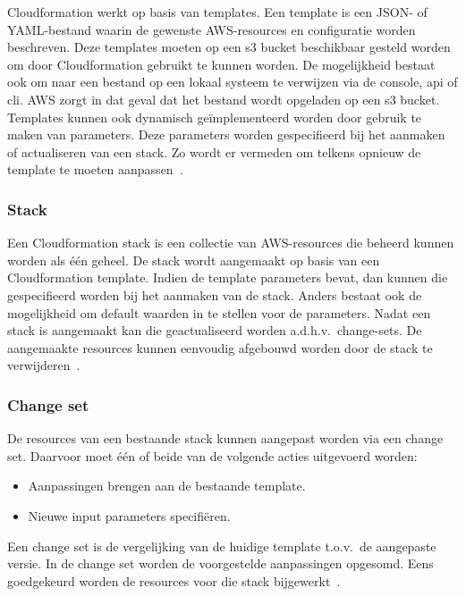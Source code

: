 Cloudformation werkt op basis van templates.
Een template is een JSON- of YAML-bestand waarin de gewenste AWS-resources en configuratie worden beschreven.
Deze templates moeten op een \acrshort{s3} bucket beschikbaar gesteld worden om door Cloudformation gebruikt te kunnen worden.
De mogelijkheid bestaat ook om naar een bestand op een lokaal systeem te verwijzen via de console, \acrshort{api} of \acrshort{cli}.
AWS zorgt in dat geval dat het bestand wordt opgeladen op een \acrshort{s3} bucket.
Templates kunnen ook dynamisch geïmplementeerd worden door gebruik te maken van parameters.
Deze parameters worden gespecifieerd bij het aanmaken of actualiseren van een stack.
Zo wordt er vermeden om telkens opnieuw de template te moeten aanpassen~\autocite{AWSCLoudformationUser}.

\subsubsection{Stack}

Een Cloudformation stack is een collectie van AWS-resources die beheerd kunnen worden als één geheel.
De stack wordt aangemaakt op basis van een Cloudformation template.
Indien de template parameters bevat, dan kunnen die gespecifieerd worden bij het aanmaken van de stack.
Anders bestaat ook de mogelijkheid om default waarden in te stellen voor de parameters.
Nadat een stack is aangemaakt kan die geactualiseerd worden a.d.h.v.\ change-sets.
De aangemaakte resources kunnen eenvoudig afgebouwd worden door de stack te verwijderen~\autocite{AWSCLoudformationUser}.

\subsubsection{Change set}

De resources van een bestaande stack kunnen aangepast worden via een change set.
Daarvoor moet één of beide van de volgende acties uitgevoerd worden:

\begin{itemize}
    \item Aanpassingen brengen aan de bestaande template.
    \item Nieuwe input parameters specifiëren.
\end{itemize}

Een change set is de vergelijking van de huidige template t.o.v.\ de aangepaste versie.
In de change set worden de voorgestelde aanpassingen opgesomd.
Eens goedgekeurd worden de resources voor die stack bijgewerkt~\autocite{AWSCLoudformationUser}.

